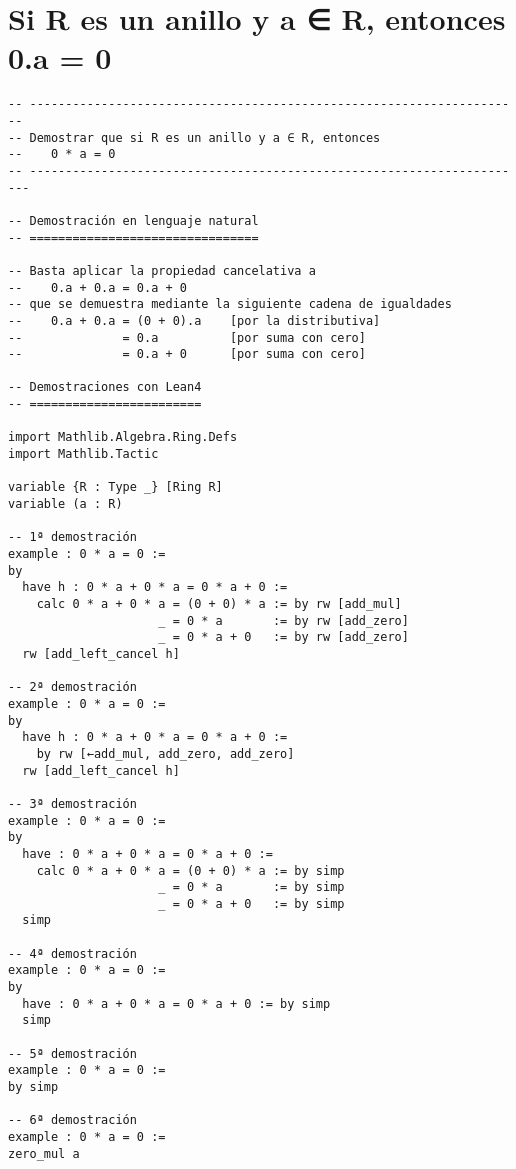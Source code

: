 \section{Si R es un anillo y a ∈ R, entonces 0.a = 0}
\label{sec:orgb130dd3}
\begin{verbatim}
-- ---------------------------------------------------------------------
-- Demostrar que si R es un anillo y a ∈ R, entonces
--    0 * a = 0
-- ----------------------------------------------------------------------

-- Demostración en lenguaje natural
-- ================================

-- Basta aplicar la propiedad cancelativa a
--    0.a + 0.a = 0.a + 0
-- que se demuestra mediante la siguiente cadena de igualdades
--    0.a + 0.a = (0 + 0).a    [por la distributiva]
--              = 0.a          [por suma con cero]
--              = 0.a + 0      [por suma con cero]

-- Demostraciones con Lean4
-- ========================

import Mathlib.Algebra.Ring.Defs
import Mathlib.Tactic

variable {R : Type _} [Ring R]
variable (a : R)

-- 1ª demostración
example : 0 * a = 0 :=
by
  have h : 0 * a + 0 * a = 0 * a + 0 :=
    calc 0 * a + 0 * a = (0 + 0) * a := by rw [add_mul]
                     _ = 0 * a       := by rw [add_zero]
                     _ = 0 * a + 0   := by rw [add_zero]
  rw [add_left_cancel h]

-- 2ª demostración
example : 0 * a = 0 :=
by
  have h : 0 * a + 0 * a = 0 * a + 0 :=
    by rw [←add_mul, add_zero, add_zero]
  rw [add_left_cancel h]

-- 3ª demostración
example : 0 * a = 0 :=
by
  have : 0 * a + 0 * a = 0 * a + 0 :=
    calc 0 * a + 0 * a = (0 + 0) * a := by simp
                     _ = 0 * a       := by simp
                     _ = 0 * a + 0   := by simp
  simp

-- 4ª demostración
example : 0 * a = 0 :=
by
  have : 0 * a + 0 * a = 0 * a + 0 := by simp
  simp

-- 5ª demostración
example : 0 * a = 0 :=
by simp

-- 6ª demostración
example : 0 * a = 0 :=
zero_mul a
\end{verbatim}

